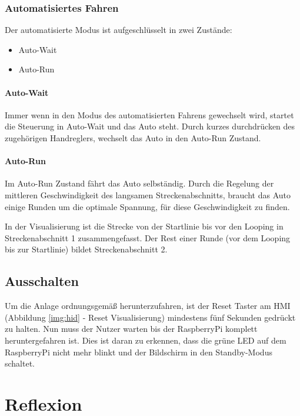\documentclass[a4paper, 11pt]{report}
\begin{document}
	\subsection{Automatisiertes Fahren}
		Der automatisierte Modus ist aufgeschlüsselt in zwei Zustände:
		\begin{itemize}
			\item Auto-Wait
			\item Auto-Run
		\end{itemize}
		\subsubsection{Auto-Wait}
		Immer wenn in den Modus des automatisierten Fahrens gewechselt wird, startet die Steuerung in
		Auto-Wait und das Auto steht.
		Durch kurzes durchdrücken des zugehörigen Handreglers, wechselt das Auto in den Auto-Run Zustand.
		\subsubsection{Auto-Run}
			Im Auto-Run Zustand fährt das Auto selbständig. Durch die Regelung der mittleren Geschwindigkeit des langsamen Streckenabschnitts, braucht das Auto einige Runden um die optimale Spannung, für diese Geschwindigkeit zu finden.

			In der Visualisierung ist die Strecke von der Startlinie bis vor den Looping in Streckenabschnitt 1 zusammengefasst.
			Der Rest einer Runde (vor dem Looping bis zur Startlinie) bildet Streckenabschnitt 2.
\section{Ausschalten}
Um die Anlage ordnungsgemäß herunterzufahren, ist der Reset Taster am HMI (Abbildung \ref{img:hid} - Reset Visualisierung) mindestens fünf Sekunden gedrückt zu halten.
Nun muss der Nutzer warten bis der RaspberryPi komplett heruntergefahren ist. Dies ist daran zu erkennen, dass die grüne LED auf dem RaspberryPi nicht mehr blinkt und der Bildschirm in den Standby-Modus schaltet.
\chapter{Reflexion}
\end{document}
